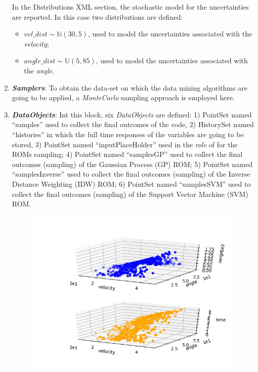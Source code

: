 \begin{enumerate}
  In the Distributions XML section, the stochastic model for the
  uncertainties are reported. In
  this case two distributions are defined:
  \begin{itemize}
    \item $vel\_dist \sim \mathbb{N}(30,5)$, used to model the uncertainties
    associated with  the \textit{velocity};
    \item  $angle\_dist \sim \mathbb{U}(5,85)$,  used to
    model the uncertainties associated with the \textit{angle}.
  \end{itemize}
   \item \textbf{\textit{Samplers}}:
  To obtain the data-set on which the data mining algorithms are going to be applied, a \textit{MonteCarlo} sampling approach is employed here.
   \item \textbf{\textit{DataObjects}}:
  Int this block, six \textit{DataObjects} are defined: 1) PointSet
  named ``samples'' used to collect the final outcomes of the code, 2)
  HistorySet named ``histories'' in which the full time responses of the
  variables are going to be stored, 3) PointSet named
  ``inputPlaceHolder'' used in the \textit{role} of  for the ROMs sampling;
  4) PointSet named ``samplesGP'' used to collect the final outcomes (sampling) of the Gaussian Process (GP) ROM;
  5) PointSet named ``samplesInverse'' used to collect the final outcomes (sampling) of the Inverse Distance Weighting (IDW) ROM;
  6) PointSet named ``samplesSVM'' used to collect the final outcomes (sampling) of the Support Vector Machine (SVM) ROM.
 \begin{figure}[h!]
  \centering
  \includegraphics[scale=0.7]{../../tests/framework/user_guide/ReducedOrderModeling/gold/ROMConstruction/1-samplesPlot3D_scatter-scatter.png}

\end{figure}
\end{enumerate}
